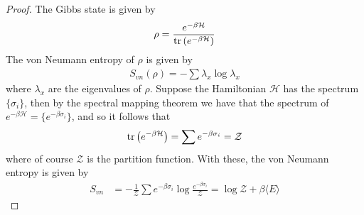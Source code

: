 \documentclass{book}
\theoremstyle{definition}
\newcommand{\had}{\mathcal{H}}
\newcommand{\f}[2]{\frac{#1}{#2}}
\newcommand{\lp}{\left(}
\newcommand{\rp}{\right)}
\begin{document}
\begin{proof}
	The Gibbs state is given by
	\begin{align}
	\rho = \f{e^{-\beta \had}}{ \tr\lp  e^{-\beta \had} \rp }
	\end{align}
	The von Neumann entropy of $\rho$ is given by
	\begin{align}
	S_{vn}(\rho) = -\sum \lambda_x \log \lambda_x
	\end{align}
	where $\lambda_x$ are the eigenvalues of $\rho$. Suppose the Hamiltonian $\had$ has the spectrum $\{ \sigma_i \}$, then by the spectral mapping theorem we have that the spectrum of $e^{-\beta \had} = \{ e^{-\beta \sigma_i} \}$, and so it follows that
	\begin{align}
	\tr\lp e^{-\beta \had} \rp = \sum e^{-\beta \sigma_i} = \mathcal{Z}
	\end{align}
	where of course $\mathcal{Z}$ is the partition function. With these, the von Neumann entropy is given by
	\begin{align}
	S_{vn} 
	&= -\f{1}{\mathcal{Z}}\sum {e^{-\beta \sigma_i}}\log \f{e^{-\beta \sigma_i}}{\mathcal{Z}} = \log \mathcal{Z} + \beta\langle E \rangle
	\end{align}

	
	
\end{proof}
\end{document}
